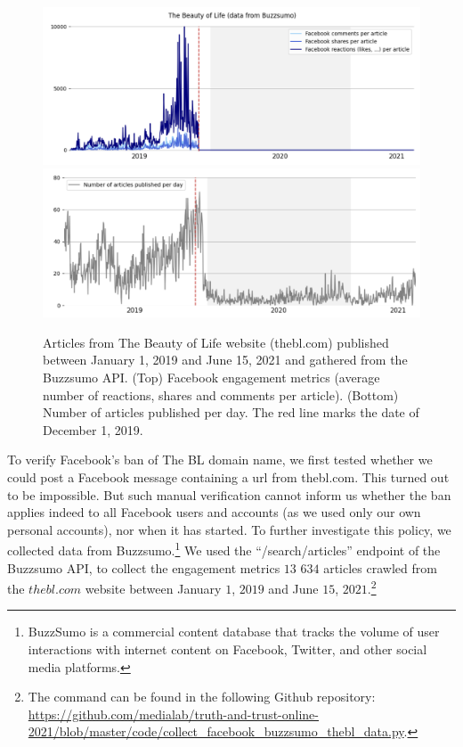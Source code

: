 \documentclass{article}
\begin{document}
\begin{figure}
	\centering
	
		\includegraphics[scale=0.3]{./img/beautyoflife/fb_bl_1.png}
		\includegraphics[scale=0.3]{./img/beautyoflife/fb_bl_2.png} 
	
	\caption{Articles from The Beauty of Life website (thebl.com) published between January 1, 2019 and June 15, 2021 and gathered from the Buzzsumo API. (Top) Facebook engagement metrics (average number of reactions, shares and comments per article). (Bottom) Number of articles published per day. The red line marks the date of December 1, 2019. }
	\label{fb_bl}
\end{figure}

To verify Facebook’s ban of The BL domain name, we first tested whether we could post a Facebook message containing a url from thebl.com. This turned out to be impossible. But such manual verification cannot inform us whether the ban applies indeed to all Facebook users and accounts (as we used only our own personal accounts), nor when it has started. To further investigate this policy, we collected data from Buzzsumo.\footnote{BuzzSumo is a commercial content database that tracks the volume of user interactions with internet content on Facebook, Twitter, and other social media platforms.} We used the ``/search/articles'' endpoint of the Buzzsumo API, to collect the engagement metrics $13$ $634$ articles crawled from the $thebl.com$ website between January $1$, $2019$ and June $15$, $2021$.\footnote{The command can be found in the following Github repository: \href{https://github.com/medialab/truth-and-trust-online-2021/blob/master/code/collect\_facebook\_buzzsumo\_thebl\_data.py}{https://github.com/medialab/truth-and-trust-online-2021/blob/master/code/collect\_facebook\_buzzsumo\_thebl\_data.py}.}
\end{document}
